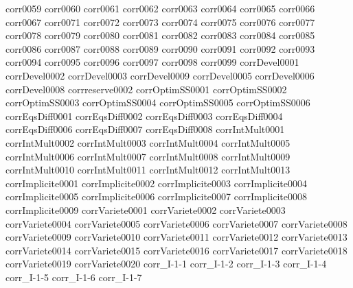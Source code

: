 {corr0059}
{corr0060}
{corr0061}
{corr0062}
{corr0063}
{corr0064}
{corr0065}
{corr0066}
{corr0067}
{corr0071}
{corr0072}
{corr0073}
{corr0074}
{corr0075}
{corr0076}
{corr0077}
{corr0078}
{corr0079}
{corr0080}
{corr0081}
{corr0082}
{corr0083}
{corr0084}
{corr0085}
{corr0086}
{corr0087}
{corr0088}
{corr0089}
{corr0090}
{corr0091}
{corr0092}
{corr0093}
{corr0094}
{corr0095}
{corr0096}
{corr0097}
{corr0098}
{corr0099}
{corrDevel0001}
{corrDevel0002}
{corrDevel0003}
{corrDevel0009}
{corrDevel0005}
{corrDevel0006}
{corrDevel0008}
{corrreserve0002}
{corrOptimSS0001}
{corrOptimSS0002}
{corrOptimSS0003}
{corrOptimSS0004}
{corrOptimSS0005}
{corrOptimSS0006}
{corrEqsDiff0001}
{corrEqsDiff0002}
{corrEqsDiff0003}
{corrEqsDiff0004}
{corrEqsDiff0006}
{corrEqsDiff0007}
{corrEqsDiff0008}
{corrIntMult0001}
{corrIntMult0002}
{corrIntMult0003}
{corrIntMult0004}
{corrIntMult0005}
{corrIntMult0006}
{corrIntMult0007}
{corrIntMult0008}
{corrIntMult0009}
{corrIntMult0010}
{corrIntMult0011}
{corrIntMult0012}
{corrIntMult0013}
{corrImplicite0001}
{corrImplicite0002}
{corrImplicite0003}
{corrImplicite0004}
{corrImplicite0005}
{corrImplicite0006}
{corrImplicite0007}
{corrImplicite0008}
{corrImplicite0009}
{corrVariete0001}
{corrVariete0002}
{corrVariete0003}
{corrVariete0004}
{corrVariete0005}
{corrVariete0006}
{corrVariete0007}
{corrVariete0008}
{corrVariete0009}
{corrVariete0010}
{corrVariete0011}
{corrVariete0012}
{corrVariete0013}
{corrVariete0014}
{corrVariete0015}
{corrVariete0016}
{corrVariete0017}
{corrVariete0018}
{corrVariete0019}
{corrVariete0020}
{corr_I-1-1}
{corr_I-1-2}
{corr_I-1-3}
{corr_I-1-4}
{corr_I-1-5}
{corr_I-1-6}
{corr_I-1-7}

